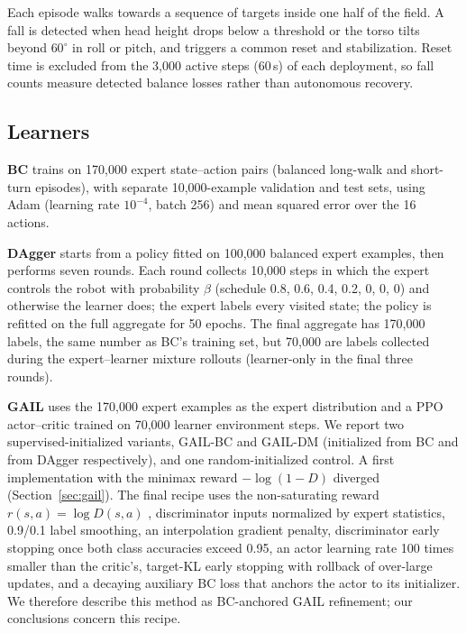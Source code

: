 \documentclass[conference]{IEEEtran}
\begin{document}
Each episode walks towards a sequence of targets inside one half of the field. A fall is detected when head height drops below a threshold or the torso tilts beyond $60^\circ$ in roll or pitch, and triggers a common reset and stabilization. Reset time is excluded from the 3,000 active steps (60\,s) of each deployment, so fall counts measure detected balance losses rather than autonomous recovery.

\subsection{Learners}
\label{sec:learners}
\textbf{BC} trains on 170,000 expert state--action pairs (balanced long-walk and short-turn episodes), with separate 10,000-example validation and test sets, using Adam (learning rate $10^{-4}$, batch 256) and mean squared error over the 16 actions.

\textbf{DAgger} starts from a policy fitted on 100,000 balanced expert examples, then performs seven rounds. Each round collects 10,000 steps in which the expert controls the robot with probability $\beta$ (schedule 0.8, 0.6, 0.4, 0.2, 0, 0, 0) and otherwise the learner does; the expert labels every visited state; the policy is refitted on the full aggregate for 50 epochs. The final aggregate has 170,000 labels, the same number as BC's training set, but 70,000 are labels collected during the expert--learner mixture rollouts (learner-only in the final three rounds).

\textbf{GAIL} uses the 170,000 expert examples as the expert distribution and a PPO actor--critic \citep{schulman2017} trained on 70,000 learner environment steps. We report two supervised-initialized variants, GAIL-BC and GAIL-DM (initialized from BC and from DAgger respectively), and one random-initialized control. A first implementation with the minimax reward $-\log(1-D)$ diverged (Section~\ref{sec:gail}). The final recipe uses the non-saturating reward $r(s,a)=\log D(s,a)$ \citep{goodfellow2014}, discriminator inputs normalized by expert statistics, 0.9/0.1 label smoothing, an interpolation gradient penalty, discriminator early stopping once both class accuracies exceed 0.95, an actor learning rate 100 times smaller than the critic's, target-KL early stopping with rollback of over-large updates, and a decaying auxiliary BC loss that anchors the actor to its initializer. We therefore describe this method as BC-anchored GAIL refinement; our conclusions concern this recipe.
\end{document}
